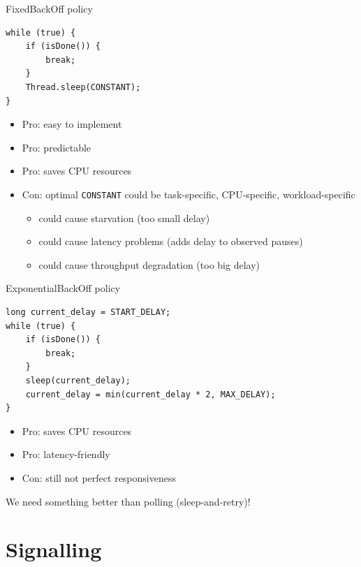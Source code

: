 
\begin{frame}[fragile]{FixedBackOff policy}

\begin{verbatim}
while (true) {
    if (isDone()) {
        break;
    }
    Thread.sleep(CONSTANT);
}
\end{verbatim}

\begin{itemize}
    \pause \item Pro: easy to implement
    \pause \item Pro: predictable
    \pause \item Pro: saves CPU resources
    \pause \item Con: optimal \texttt{CONSTANT} could be task-specific, CPU-specific, workload-specific 
    \begin{itemize}
        \pause \item could cause starvation (too small delay)
        \pause \item could cause latency problems (adds delay to observed pauses)
        \pause \item could cause throughput degradation (too big delay)
    \end{itemize}
\end{itemize}      
\end{frame}

\begin{frame}[fragile]{ExponentialBackOff policy}

\begin{verbatim}
long current_delay = START_DELAY;
while (true) {
    if (isDone()) {
        break;
    }
    sleep(current_delay);
    current_delay = min(current_delay * 2, MAX_DELAY);
}
\end{verbatim}

\begin{itemize}
    \pause \item Pro: saves CPU resources
    \pause \item Pro: latency-friendly
    \pause \item Con: still not perfect responsiveness    
\end{itemize}

\pause
We need something better than polling (sleep-and-retry)!
\end{frame}


\section{Signalling}
\showTOC

